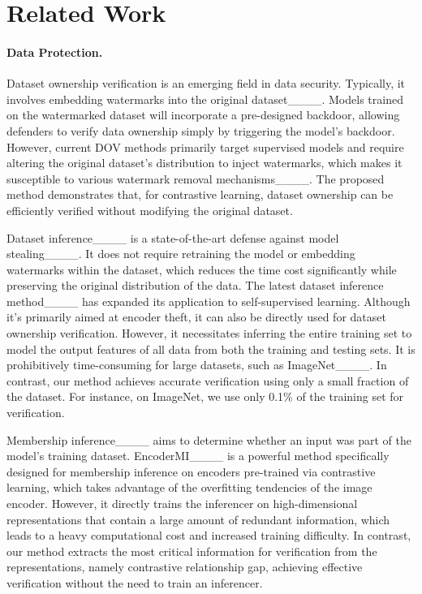 \section{Related Work}
\label{gen_inst}


\paragraph{Data Protection.}
Dataset ownership verification is an emerging field in data security. Typically, it involves embedding watermarks into the original dataset____. Models trained on the watermarked dataset will incorporate a pre-designed backdoor, allowing defenders to verify data ownership simply by triggering the model’s backdoor. However, current DOV methods primarily target supervised models and require altering the original dataset's distribution to inject watermarks, which makes it susceptible to various watermark removal mechanisms____. 
The proposed method demonstrates that, for contrastive learning, dataset ownership can be efficiently verified without modifying the original dataset. 

Dataset inference____ is a state-of-the-art defense against model stealing____. It does not require retraining the model or embedding watermarks within the dataset, which reduces the time cost significantly while preserving the original distribution of the data. The latest dataset inference method____ has expanded its application to self-supervised learning. Although it's primarily aimed at encoder theft, it can also be directly used for dataset ownership verification. However, it necessitates inferring the entire training set to model the output features of all data from both the training and testing sets. It is prohibitively time-consuming for large datasets, such as ImageNet____. In contrast, our method achieves accurate verification using only a small fraction of the dataset. For instance, on ImageNet, we use only 0.1\% of the training set for verification.

Membership inference____ aims to determine whether an input was part of the model's training dataset. EncoderMI____ is a powerful method specifically designed for membership inference on encoders pre-trained via contrastive learning, which takes advantage of the overfitting tendencies of the image encoder. However, it directly trains the inferencer on high-dimensional representations that contain a large amount of redundant information, which leads to a heavy computational cost and increased training difficulty. In contrast, our method extracts the most critical information for verification from the representations, namely contrastive relationship gap, achieving effective verification without the need to train an inferencer. 


